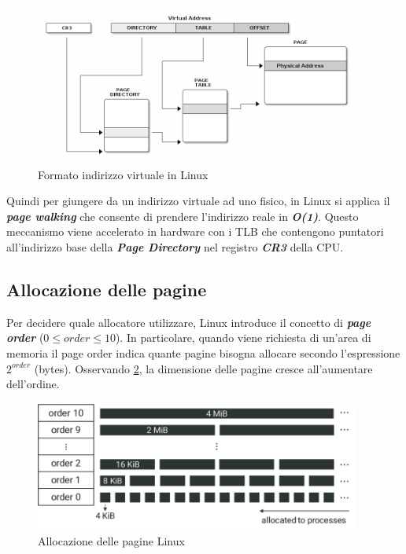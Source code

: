 \documentclass{article}
\begin{document}
\begin{figure}[h]
  \begin{center}
    \includegraphics[width=0.95\textwidth]{figures/ch1/linux_va.png}
  \end{center}
  \caption{Formato indirizzo virtuale in Linux}\label{fig:linux_va}
\end{figure}

Quindi per giungere da un indirizzo virtuale ad uno fisico, in Linux si applica il 
\textbf{\textit{page walking}} che consente di prendere l'indirizzo reale in \textbf{\textit{O(1)}}. 
Questo meccanismo viene accelerato in hardware con i TLB che contengono puntatori all'indirizzo 
base della \textbf{\textit{Page Directory}} nel registro \textbf{\textit{CR3}} della CPU.

\subsection{Allocazione delle pagine}
Per decidere quale allocatore utilizzare, Linux introduce il concetto di \textbf{\textit{page order}} 
($0 \leq order \leq 10$). In particolare, quando viene richiesta di un'area di memoria il 
page order indica quante pagine bisogna allocare secondo l'espressione $2^{order}$ (bytes). 
Osservando \cref{fig:order}, la dimensione delle 
pagine cresce all'aumentare dell'ordine.

\begin{figure}[h]
  \begin{center}
    \includegraphics[width=0.95\textwidth]{figures/ch1/Memory-management-in-Linux-via-the-buddy-allocator-algorithm-Memory-spaces-are-divided.png}
  \end{center}
  \caption{Allocazione delle pagine Linux}\label{fig:order}
\end{figure}
\end{document}
